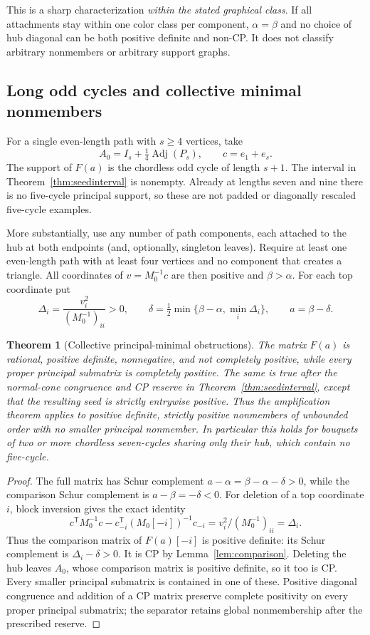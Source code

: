 \documentclass[11pt]{article}
\newtheorem{theorem}{Theorem}[section]
\theoremstyle{definition}\newtheorem{definition}[theorem]{Definition}
\theoremstyle{remark}\newtheorem{remark}[theorem]{Remark}
\newcommand{\T}{^{\mathsf T}}\newcommand{\norm}[1]{\lVert #1\rVert}
\begin{document}
This is a sharp characterization \emph{within the stated graphical class}. If all attachments stay within one color class per component, $\alpha=\beta$ and no choice of hub diagonal can be both positive definite and non-CP. It does not classify arbitrary nonmembers or arbitrary support graphs.

\subsection{Long odd cycles and collective minimal nonmembers}
For a single even-length path with $s\ge4$ vertices, take
\[
 A_0=I_s+\tfrac14\operatorname{Adj}(P_s),\qquad c=e_1+e_s.
\]
The support of $F(a)$ is the chordless odd cycle of length $s+1$. The interval in Theorem~\ref{thm:seedinterval} is nonempty. Already at lengths seven and nine there is no five-cycle principal support, so these are not padded or diagonally rescaled five-cycle examples.

More substantially, use any number of path components, each attached to the hub at both endpoints (and, optionally, singleton leaves). Require at least one even-length path with at least four vertices and no component that creates a triangle. All coordinates of $v=M_0^{-1}c$ are then positive and $\beta>\alpha$. For each top coordinate put
\[
 \Delta_i=\frac{v_i^2}{(M_0^{-1})_{ii}}>0,\qquad
 \delta=\tfrac12\min\{\beta-\alpha,\min_i\Delta_i\},\qquad a=\beta-\delta.
\]

\begin{theorem}[Collective principal-minimal obstructions]\label{thm:minimal}
The matrix $F(a)$ is rational, positive definite, nonnegative, and not completely positive, while \emph{every proper principal submatrix is completely positive}. The same is true after the normal-cone congruence and CP reserve in Theorem~\ref{thm:seedinterval}, except that the resulting seed is strictly entrywise positive. Thus the amplification theorem applies to positive definite, strictly positive nonmembers of unbounded order with no smaller principal nonmember. In particular this holds for bouquets of two or more chordless seven-cycles sharing only their hub, which contain no five-cycle.
\end{theorem}
\begin{proof}
The full matrix has Schur complement $a-\alpha=\beta-\alpha-\delta>0$, while the comparison Schur complement is $a-\beta=-\delta<0$. For deletion of a top coordinate $i$, block inversion gives the exact identity
\[
 c\T M_0^{-1}c-c_{-i}\T(M_0[-i])^{-1}c_{-i}
 =v_i^2/(M_0^{-1})_{ii}=\Delta_i.
\]
Thus the comparison matrix of $F(a)[-i]$ is positive definite: its Schur complement is $\Delta_i-\delta>0$. It is CP by Lemma~\ref{lem:comparison}. Deleting the hub leaves $A_0$, whose comparison matrix is positive definite, so it too is CP. Every smaller principal submatrix is contained in one of these. Positive diagonal congruence and addition of a CP matrix preserve complete positivity on every proper principal submatrix; the separator retains global nonmembership after the prescribed reserve.
\end{proof}
\end{document}
